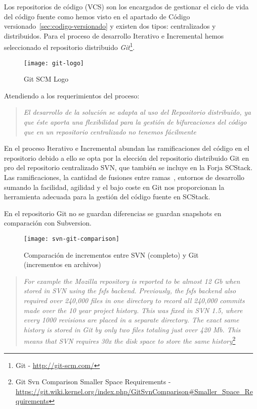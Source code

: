 \par Los repositorios de código (VCS) son los encargados de gestionar el ciclo de vida del código fuente como hemos visto en el apartado de Código versionado~\ref{sec:codigo-versionado} y existen dos tipos: centralizados y distribuidos. Para el proceso de desarrollo Iterativo e Incremental hemos seleccionado el repositorio distribuido \emph{Git}\footnote{Git - \url{http://git-scm.com/}}.

\begin{figure}[H]
    \centering
    \texttt{[image: git-logo]}
    \caption{Git SCM Logo}
    \label{fig:git-scm-logo}
\end{figure}

\par Atendiendo a los requerimientos del proceso:

\begin{quote}
    \emph{El desarrollo de la solución se adapta al uso del Repositorio distribuido, ya que éste aporta una flexibilidad para la gestión de bifurcaciones del código que en un repositorio centralizado no tenemos fácilmente}
\end{quote}

\par En el proceso Iterativo e Incremental abundan las ramificaciones del código en el repositorio debido a ello se opta por la elección del repositorio distribuido Git en pro del repositorio centralizado SVN, que también se incluye en la Forja SCStack. Las ramificaciones, la cantidad de fusiones entre ramas~\cite{featurebranch}, entornos de desarrollo sumando la facilidad, agilidad y el bajo coste en Git nos proporcionan la herramienta adecuada para la gestión del código fuente en SCStack.

\par En el repositorio Git no se guardan diferencias se guardan snapshots en comparación con Subversion.

\begin{figure}[H]
    \centering
    \texttt{[image: svn-git-comparison]}
    \caption{Comparación de incrementos entre SVN (completo) y Git (incrementos en archivos)}
    \label{fig:svn-git-comparison}
\end{figure}

\begin{quotation}
    \emph{For example the Mozilla repository is reported to be almost 12 Gb when stored in SVN using the fsfs backend. Previously, the fsfs backend also required over 240,000 files in one directory to record all 240,000 commits made over the 10 year project history. This was fixed in SVN 1.5, where every 1000 revisions are placed in a separate directory. The exact same history is stored in Git by only two files totaling just over 420 Mb. This means that SVN requires 30x the disk space to store the same history}\footnote{Git Svn Comparison Smaller Space Requirements - \url{https://git.wiki.kernel.org/index.php/GitSvnComparison\#Smaller\_Space\_Requirements}}
\end{quotation}

